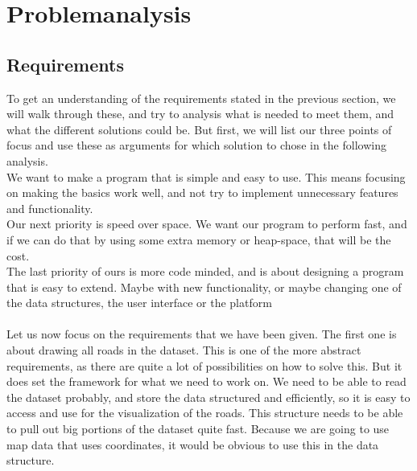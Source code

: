 \documentclass[a4paper,10pt,titlepage]{article}
\begin{document}
	\newpage

	\section{Problemanalysis}
		\subsection{Requirements}
To get an understanding of the requirements stated in the previous section, we will walk through these, and try to analysis what is needed to meet them, and what the different solutions could be. But first, we will list our three points of focus and use these as arguments for which solution to chose in the following analysis.\\
We want to make a program that is simple and easy to use. This means focusing on making the basics work well, and not try to implement unnecessary features and functionality.\\

Our next priority is speed over space. We want our program to perform fast, and if we can do that by using some extra     memory or heap-space, that will be the cost.\\

The last priority of ours is more code minded, and is about designing a program that is easy to extend. Maybe with new functionality, or maybe changing one of the data structures, the user interface or the platform\\
\\

Let us now focus on the requirements that we have been given. The first one is about drawing all roads in the dataset. This is one of the more abstract requirements, as there are quite a lot of possibilities on how to solve this. But it does set the framework for what we need to work on. We need to be able to read the dataset probably, and store the data structured and efficiently, so it is easy to access and use for the visualization of the roads. This structure needs to be able to pull out big portions of the dataset quite fast. Because we are going to use map data that uses coordinates, it would be obvious to use this in the data structure.\\
\end{document}
